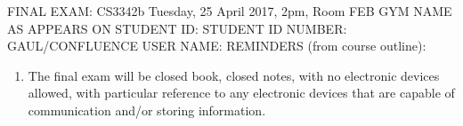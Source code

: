 \documentclass{exam}
\begin{document}
FINAL EXAM: CS3342b Tuesday, 25 April 2017, 2pm, Room FEB GYM\newline
\newline
\newline
\newline
NAME AS APPEARS ON STUDENT ID:\newline
\newline
STUDENT ID NUMBER:\newline
\newline
GAUL/CONFLUENCE USER NAME:\newline
\newline
REMINDERS (from course outline):
\begin{enumerate}
\item The final exam will be closed book, closed notes, with no electronic devices allowed, with particular reference to any electronic devices that are capable of communication and/or storing information.
\end{enumerate}
\newpage
\end{document}
